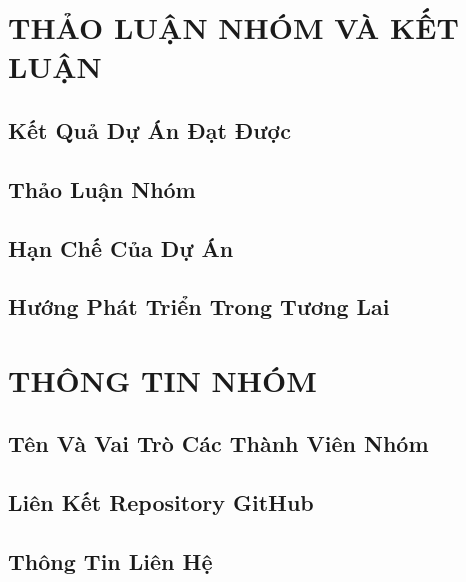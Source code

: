 \section{THẢO LUẬN NHÓM VÀ KẾT LUẬN}

\subsection{Kết Quả Dự Án Đạt Được}

\subsection{Thảo Luận Nhóm}

\subsection{Hạn Chế Của Dự Án}

\subsection{Hướng Phát Triển Trong Tương Lai}

\newpage

\section{THÔNG TIN NHÓM}

\subsection{Tên Và Vai Trò Các Thành Viên Nhóm}

\subsection{Liên Kết Repository GitHub}

\subsection{Thông Tin Liên Hệ}


\newpage
